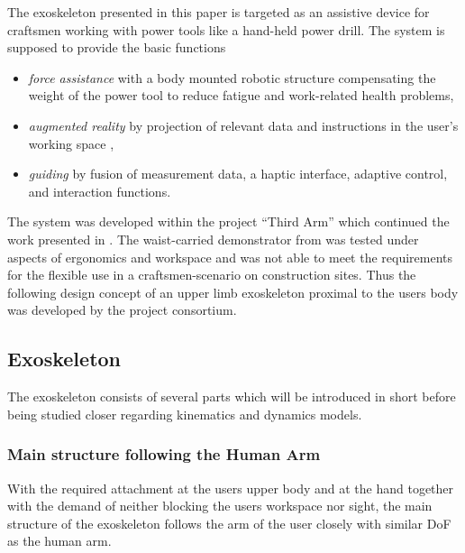 \documentclass[letterpaper, 10 pt, conference]{ieeeconf}  %
\begin{document}
The exoskeleton presented in this paper is targeted as an assistive device for craftsmen working with power tools like a hand-held power drill.
The system is supposed to provide the basic functions
%
\begin{itemize}
    \item \emph{force assistance} with a body mounted robotic structure compensating the weight of the power tool to reduce fatigue and work-related health problems,
    \item \emph{augmented reality} by projection of relevant data and instructions in the user's working space \cite{NuelleBriTapDem2018},
    \item \emph{guiding} by fusion of measurement data, a haptic interface, adaptive control, and interaction functions.
\end{itemize}
%
%
%
The system was developed within the project ``Third Arm'' \cite{NuelleSchTapLil2017} which continued the work presented in \cite{PetereitAlbJerSch2012}. 
The waist-carried demonstrator from \cite{PetereitAlbJerSch2012} was tested under aspects of ergonomics and workspace and was not able to meet the requirements for the flexible use in a  craftsmen-scenario on construction sites. Thus the following design concept of an upper limb exoskeleton proximal to the users body was developed by the project consortium.

\subsection{Exoskeleton}

The exoskeleton consists of several parts which will be introduced in short before being studied closer regarding kinematics and dynamics models.

\subsubsection{Main structure following the Human Arm}

With the required attachment at the users upper body and at the hand together with the demand of neither blocking the users workspace nor sight, the main structure of the exoskeleton follows the arm of the user closely with similar DoF as the human arm.
\end{document}
